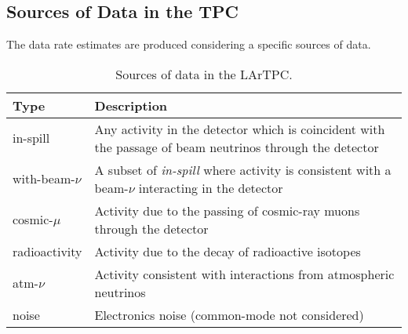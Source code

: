 \subsection{Sources of Data in the TPC}

The data rate estimates are produced considering a specific sources of
data.


\begin{table}[ht!]
	\centering
	\begin{tabular}{| p{1in} | p{4.5in} |}
		\hline
	\textbf{Type} & \textbf{Description} \\ \hline
		
	in-spill & Any activity in the detector which is coincident with
	the passage of beam neutrinos through the detector \\ \hline
	
	with-beam-$\nu$ & A subset of \textit{in-spill} where activity is
	consistent with a beam-$\nu$ interacting in the detector \\ \hline
	
	cosmic-$\mu$ & Activity due to the passing of cosmic-ray muons
	through the detector \\ \hline
	
	radioactivity & Activity due to the decay of radioactive
	isotopes \\ \hline
	
	atm-$\nu$ & Activity consistent with interactions from
	atmospheric neutrinos \\ \hline
	
	noise & Electronics noise (common-mode not considered) \\ \hline

	\end{tabular}
	\caption{Sources of data in the LArTPC.}
	\label{tab:dune-data-sources}
\end{table}







